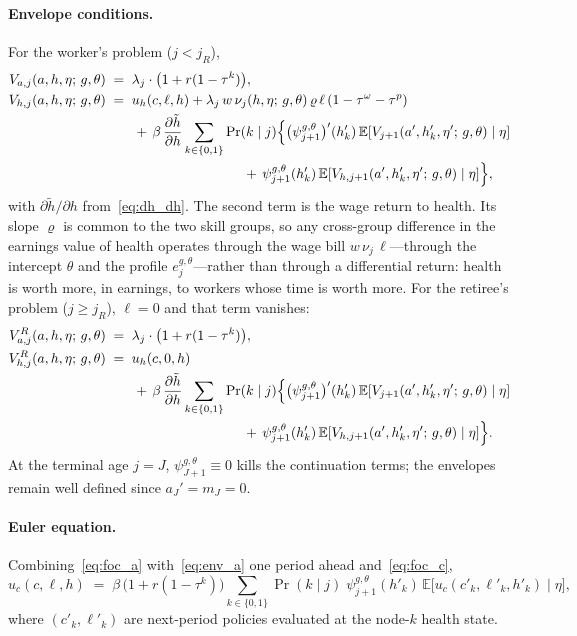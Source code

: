 \documentclass[12pt,a4paper]{article}
\newcommand{\E}{\mathbb{E}}
\begin{document}
\begin{appendices}
\paragraph{Envelope conditions.} For the worker's problem ($j < j_R$),
\begin{align}
V_{a, j}(a, h, \eta;\, g, \theta) &\;=\; \lambda_j \cdot \bigl(1 + r(1-\tau^k)\bigr), \label{eq:env_a}\\
V_{h, j}(a, h, \eta;\, g, \theta) &\;=\; u_h(c, \ell, h) + \lambda_j\, w\, \nu_j(h, \eta;\, g, \theta)\, \varrho\, \ell\, (1-\tau^\omega-\tau^p) \notag\\
&\qquad +\, \beta\, \frac{\partial \tilde h}{\partial h} \sum_{k \in \{0,1\}} \Pr(k \mid j)\Bigl\{ \bigl(\psi_{j+1}^{g,\theta}\bigr)'(h'_k)\, \E[V_{j+1}(a', h'_k, \eta';\, g, \theta) \mid \eta] \notag\\
&\qquad\qquad\qquad\qquad\qquad +\, \psi_{j+1}^{g,\theta}(h'_k)\, \E[V_{h, j+1}(a', h'_k, \eta';\, g, \theta) \mid \eta] \Bigr\}, \label{eq:env_h}
\end{align}
with $\partial \tilde h / \partial h$ from~\eqref{eq:dh_dh}. The second term is the wage return to health. Its slope $\varrho$ is common to the two skill groups, so any cross-group difference in the earnings value of health operates through the wage bill $w\,\nu_j\,\ell$---through the intercept $\theta$ and the profile $e^{g,\theta}_j$---rather than through a differential return: health is worth more, in earnings, to workers whose time is worth more. For the retiree's problem ($j \geq j_R$), $\ell = 0$ and that term vanishes:
\begin{align}
V_{a, j}^{R}(a, h, \eta;\, g, \theta) &\;=\; \lambda_j \cdot \bigl(1 + r(1-\tau^k)\bigr), \label{eq:env_a_ret}\\
V_{h, j}^{R}(a, h, \eta;\, g, \theta) &\;=\; u_h(c, 0, h) \notag\\
&\qquad +\, \beta\, \frac{\partial \tilde h}{\partial h} \sum_{k \in \{0,1\}} \Pr(k \mid j)\Bigl\{ \bigl(\psi_{j+1}^{g,\theta}\bigr)'(h'_k)\, \E[V_{j+1}(a', h'_k, \eta';\, g, \theta) \mid \eta] \notag\\
&\qquad\qquad\qquad\qquad\qquad +\, \psi_{j+1}^{g,\theta}(h'_k)\, \E[V_{h, j+1}(a', h'_k, \eta';\, g, \theta) \mid \eta] \Bigr\}. \label{eq:env_h_ret}
\end{align}
At the terminal age $j = J$, $\psi^{g,\theta}_{J+1} \equiv 0$ kills the continuation terms; the envelopes remain well defined since $a_J' = m_J = 0$.

\paragraph{Euler equation.} Combining~\eqref{eq:foc_a} with~\eqref{eq:env_a} one period ahead and~\eqref{eq:foc_c},
\begin{equation}
\label{eq:euler}
u_c(c, \ell, h) \;=\; \beta\, \bigl(1 + r(1-\tau^k)\bigr) \sum_{k \in \{0,1\}} \Pr(k \mid j)\; \psi_{j+1}^{g,\theta}(h'_k)\, \E\bigl[u_c(c'_k, \ell'_k, h'_k) \mid \eta\bigr],
\end{equation}
where $(c'_k, \ell'_k)$ are next-period policies evaluated at the node-$k$ health state.


\end{appendices}
\end{document}
